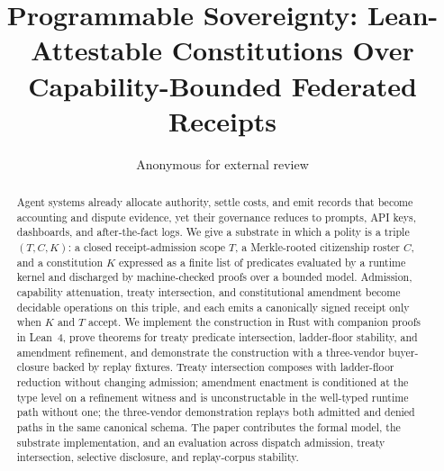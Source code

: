 \documentclass[sigconf,anonymous,review,nonacm]{acmart}
\title{Programmable Sovereignty: Lean-Attestable Constitutions Over Capability-Bounded Federated Receipts}
\author{Anonymous for external review}
\affiliation{\institution{Anonymous Institution}}
\begin{document}
\begin{abstract}
Agent systems already allocate authority, settle costs, and emit records that become accounting and dispute evidence, yet their governance reduces to prompts, API keys, dashboards, and after-the-fact logs. We give a substrate in which a polity is a triple $(T, C, K)$: a closed receipt-admission scope $T$, a Merkle-rooted citizenship roster $C$, and a constitution $K$ expressed as a finite list of predicates evaluated by a runtime kernel and discharged by machine-checked proofs over a bounded model. Admission, capability attenuation, treaty intersection, and constitutional amendment become decidable operations on this triple, and each emits a canonically signed receipt only when $K$ and $T$ accept. We implement the construction in Rust with companion proofs in Lean~4, prove theorems for treaty predicate intersection, ladder-floor stability, and amendment refinement, and demonstrate the construction with a three-vendor buyer-closure backed by replay fixtures. Treaty intersection composes with ladder-floor reduction without changing admission; amendment enactment is conditioned at the type level on a refinement witness and is unconstructable in the well-typed runtime path without one; the three-vendor demonstration replays both admitted and denied paths in the same canonical schema. The paper contributes the formal model, the substrate implementation, and an evaluation across dispatch admission, treaty intersection, selective disclosure, and replay-corpus stability.
\end{abstract}

\maketitle














\end{document}
